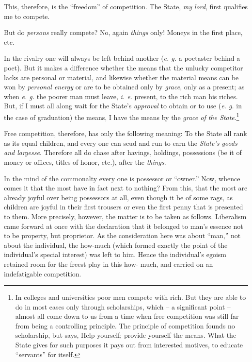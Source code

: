 \documentclass[12pt,a4paper]{book}
\begin{document}
This, therefore, is the ``freedom'' of competition. The State, \textit{my 
lord}, first qualifies me to compete.

But do \textit{persons} really compete? No, again \textit{things} only! Moneys 
in the first place, etc.

In the rivalry one will always be left behind another (\textit{e. g.} a 
poetaster behind a poet). But it makes a difference whether the means that the 
unlucky competitor lacks are personal or material, and likewise whether the 
material means can be won by \textit{personal energy} or are to be obtained 
only by \textit{grace}, only as a present; as when \textit{e. g.} the poorer 
man must leave, \textit{i. e.} present, to the rich man his riches. But, if I 
must all along wait for the State's \textit{approval} to obtain or to use 
(\textit{e. g.} in the case of graduation) the means, I have the means by the 
\textit{grace of the State}.\footnote{In colleges and universities poor men 
compete with rich. But they are able to do in most eases only through 
scholarships, which -- a significant point -- almost all come down to us from 
a time when free competition was still far from being a controlling principle. 
The principle of competition founds no scholarship, but says, Help yourself; 
provide yourself the means. What the State gives for such purposes it pays out 
from interested motives, to educate ``servants'' for itself.}

Free competition, therefore, has only the following meaning: To the State all 
rank as its equal children, and every one can scud and run to earn the 
\textit{State's goods and largesse}. Therefore all do chase after havings, 
holdings, possessions (be it of money or offices, titles of honor, etc.), 
after the \textit{things}.

In the mind of the commonalty every one is possessor or ``owner.'' Now, 
whence comes it that the most have in fact next to nothing? From this, that 
the most are already joyful over being possessors at all, even though it be of 
some rags, as children are joyful in their first trousers or even the first 
penny that is presented to them. More precisely, however, the matter is to be 
taken as follows. Liberalism came forward at once with the declaration that it 
belonged to man's essence not to be property, but proprietor. As the 
consideration here was about ``man,'' not about the individual, the how-much 
(which formed exactly the point of the individual's special interest) was left 
to him. Hence the individual's egoism retained room for the freest play in 
this how- much, and carried on an indefatigable competition.
\end{document}
